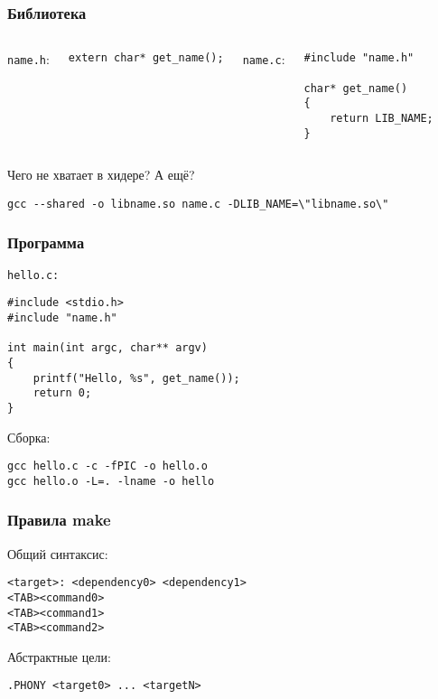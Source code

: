 \begin{frame}[fragile]
	\frametitle{Библиотека}

	\begin{columns}
		{\tt name.h}:

		\begin{lstlisting}
extern char* get_name();
		\end{lstlisting}

		{\tt name.c}:

		\begin{lstlisting}
#include "name.h"

char* get_name()
{
    return LIB_NAME;
}
		\end{lstlisting}
	\end{columns}
	
	\begin{center}
	Чего не хватает в хидере? А ещё?
\end{center}

	\begin{lstlisting}
gcc --shared -o libname.so name.c -DLIB_NAME=\"libname.so\"
	\end{lstlisting}
\end{frame}

\begin{frame}[fragile]
	\frametitle{Программа}

	{\tt hello.с:}

	\begin{lstlisting}
#include <stdio.h>
#include "name.h"

int main(int argc, char** argv)
{
    printf("Hello, %s", get_name());
    return 0;
}
	\end{lstlisting}

	Сборка:

	\begin{verbatim}
gcc hello.c -c -fPIC -o hello.o
gcc hello.o -L=. -lname -o hello
	\end{verbatim}
\end{frame}

\begin{frame}[fragile]
	\frametitle{Правила make}

	Общий синтаксис:
	\begin{verbatim}
<target>: <dependency0> <dependency1>
<TAB><command0>
<TAB><command1>
<TAB><command2>
	\end{verbatim}

	Абстрактные цели:
	\begin{verbatim}
.PHONY <target0> ... <targetN>
	\end{verbatim}
\end{frame}


